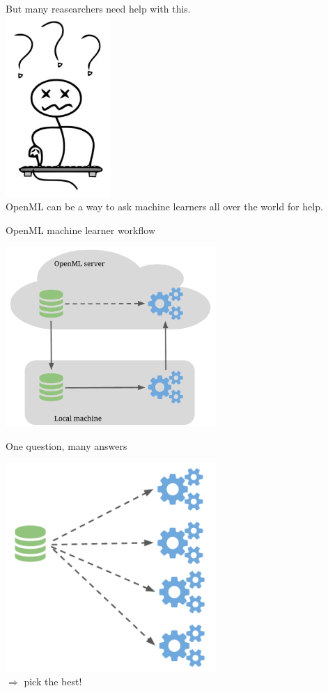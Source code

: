\documentclass{beamer}
\begin{document}
\begin{frame}[fragile]{}
\large 
\begin{center}
But many reasearchers need help with this.\\
\includegraphics[width = 0.3\textwidth]{confused}\\
OpenML can be a way to ask machine learners all over the world for help.
\end{center}
\end{frame}

\begin{frame}[fragile]{OpenML machine learner workflow}
\begin{center}
\includegraphics[width = 0.6\textwidth]{wf}
\end{center}
\end{frame}

\begin{frame}[fragile]{One question, many answers}
\begin{center}
\includegraphics[width = 0.6\textwidth]{wf_ds}\\[2em]
\large $\Rightarrow$ pick the best!
\end{center}
\end{frame}
\end{document}
